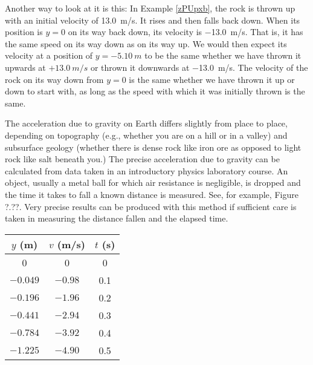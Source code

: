 \documentclass[../../main-ap-physics.tex]{subfiles}
\begin{document}
\vspace{1em}

Another way to look at it is this: In Example \ref{zPUpxb}, the rock is thrown up with an initial velocity of \SI{13.0}{m/s}. It rises and then falls back down. When its position is $y = 0$ on its way back down, its velocity is \SI{-13.0}{m/s}. That is, it has the same speed on its way down as on its way up. We would then expect its velocity at a position of $y = \SI{-5.10}{m}$ to be the same whether we have thrown it upwards at $+\SI{13.0}{m/s}$ or thrown it downwards at \SI{-13.0}{m/s}. The velocity of the rock on its way down from $y = 0$ is the same whether we have thrown it up or down to start with, as long as the speed with which it was initially thrown is the same.

\endsolution

\begin{example}
    The acceleration due to gravity on Earth differs slightly from place to place, depending on topography (e.g., whether you are on a hill or in a valley) and subsurface geology (whether there is dense rock like iron ore as opposed to light rock like salt beneath you.) The precise acceleration due to gravity can be calculated from data taken in an introductory physics laboratory course. An object, usually a metal ball for which air resistance is negligible, is dropped and the time it takes to fall a known distance is measured. See, for example, Figure ?.??. Very precise results can be produced with this method if sufficient care is taken in measuring the distance fallen and the elapsed time.

    \begin{center}
        \begin{tabular}{c|c|c}
            \textbf{$y$ (m)} & \textbf{$v$ (m/s)}  & \textbf{$t$ (s)}\\ \hline
             0 & 0 & 0\\
             $-0.049$ & $-0.98$ & 0.1\\
             $-0.196$ & $-1.96$ & 0.2\\
             $-0.441$ & $-2.94$ & 0.3\\
             $-0.784$ & $-3.92$ & 0.4\\
             $-1.225$ & $-4.90$ & 0.5 \\ \hline
        \end{tabular}
    \end{center}
\end{example}
\end{document}
